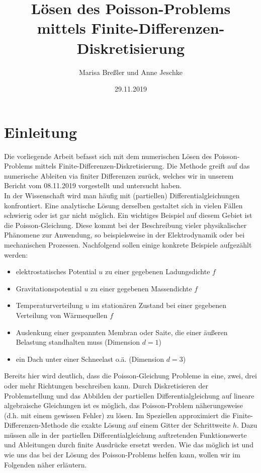 \documentclass{scrartcl}
\begin{document}
\title{Lösen des Poisson-Problems mittels Finite-Differenzen-Diskretisierung}
\author{Marisa Breßler und Anne Jeschke}
\date{29.11.2019}
\maketitle

\tableofcontents

\pagebreak
\section{Einleitung}
Die vorliegende Arbeit befasst sich mit dem numerischen Lösen des Poisson-Problems mittels Finite-Differenzen-Diskretisierung. Die Methode greift auf das numerische Ableiten via finiter Differenzen zurück, welches wir in unserem Bericht vom 08.11.2019 vorgestellt und untersucht haben.\\
In der Wissenschaft wird man häufig mit (partiellen) Differentialgleichungen konfrontiert. Eine analytische Lösung derselben gestaltet sich in vielen Fällen schwierig oder ist gar nicht möglich. Ein wichtiges Beispiel auf diesem Gebiet ist die Poisson-Gleichung. Diese kommt bei der Beschreibung vieler physikalischer Phänomene zur Anwendung, so beispielsweise in der Elektrodynamik oder bei mechanischen Prozessen. Nachfolgend sollen einige konkrete Beispiele aufgezählt werden:
\begin{itemize}
\item elektrostatisches Potential $u$ zu einer gegebenen Ladungsdichte $f$
\item Gravitationspotential $u$ zu einer gegebenen Massendichte $f$
\item Temperaturverteilung $u$ im stationären Zustand bei einer gegebenen Verteilung von Wärmequellen $f$
\item Auslenkung einer gespannten Membran oder Saite, die einer äußeren Belastung standhalten muss (Dimension $d=1$)
\item ein Dach unter einer Schneelast o.ä. (Dimension $d=3$)
\end{itemize}
Bereits hier wird deutlich, dass die Poisson-Gleichung Probleme in eine, zwei, drei oder mehr Richtungen beschreiben kann. Durch Diskretisieren der Problemstellung und das Abbilden der partiellen Differentialgleichung auf lineare algebraische Gleichungen ist es möglich, das Poisson-Problem näherungsweise (d.h. mit einem gewissen Fehler) zu lösen. Im Speziellen approximiert die Finite-Differenzen-Methode die exakte Lösung auf einem Gitter der Schrittweite $h$. Dazu müssen alle in der partiellen Differentialgleichung auftretenden Funktionswerte und Ableitungen durch finite Ausdrücke ersetzt werden. Wie das möglich ist und wie uns das bei der Lösung des Poisson-Problems helfen kann, wollen wir im Folgenden näher erläutern.\cite{schwedt2016, tischendorf2019}
\end{document}
